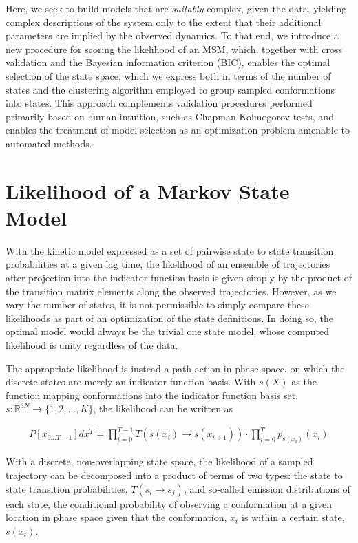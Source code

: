 \documentclass[twocolumn,floatfix,nofootinbib,aps]{revtex4-1}
\begin{document}
Here, we seek to build models that are \emph{suitably} complex, given the data, yielding complex descriptions of the system only to the extent that their additional parameters are implied by the observed dynamics. To that end, we introduce a new procedure for scoring the likelihood of an MSM, which, together with cross validation and the Bayesian information criterion (BIC), enables the optimal selection of the state space, which we express both in terms of the number of states and the clustering algorithm employed to group sampled conformations into states. This approach complements validation procedures performed primarily based on human intuition, such as Chapman-Kolmogorov tests, and enables the treatment of model selection as an optimization problem amenable to automated methods.

\section{Likelihood of a Markov State Model}
With the kinetic model expressed as a set of pairwise state to state transition probabilities at a given lag time, the likelihood of an ensemble of trajectories after projection into the indicator function basis is given simply by the product of the transition matrix elements along the observed trajectories. However, as we vary the number of states, it is not permissible to simply compare these likelihoods as part of an optimization of the state definitions. In doing so, the optimal model would always be the trivial one state model, whose computed likelihood is unity regardless of the data.

The appropriate likelihood is instead a path action in phase space, on which the discrete states are merely an indicator function basis. With $s(X)$ as the function mapping conformations into the indicator function basis set, $s : \mathbb{R}^{3N} \rightarrow \{1, 2, \ldots, K\}$, the likelihood can be written as

\begin{align}
P[x_{0...T-1}] dx^T = \prod_{i=0}^{T-1} T(s(x_i) \rightarrow s(x_{i+1})) \cdot \prod_{i=0}^{T} p_{s(x_i)}(x_{i})
\label{eq:like}
\end{align}

With a discrete, non-overlapping state space, the likelihood of a sampled trajectory can be decomposed into a product of terms of two types: the state to state transition probabilities, $T(s_i \rightarrow s_j)$, and so-called emission distributions of each state, the conditional probability of observing a conformation at a given location in phase space given that the conformation, $x_t$ is within a certain state, $s(x_t)$.
\end{document}
